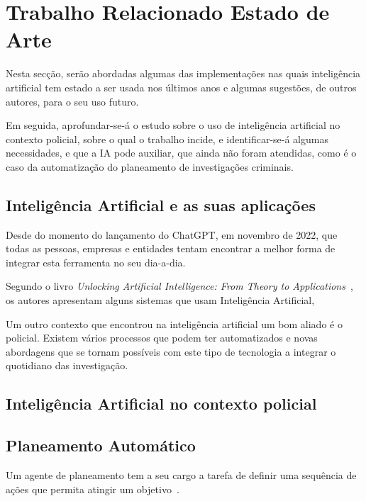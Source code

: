 % 
%  
%
\chapter{Trabalho Relacionado Estado de Arte}
\label{cha:trab_art}

Nesta secção, serão abordadas algumas  das implementações nas quais inteligência artificial tem estado a ser usada nos últimos anos e algumas sugestões, de outros autores, para o seu uso futuro.

Em seguida, aprofundar-se-á o estudo sobre o uso de inteligência artificial no contexto policial, sobre o qual o trabalho incide, e identificar-se-á algumas necessidades, e que a IA pode auxiliar, que ainda não foram atendidas, como é o caso da automatização do planeamento de investigações criminais.

\section{Inteligência Artificial e as suas aplicações}
\label{sec:ia_aplic}

Desde do momento do lançamento do ChatGPT, em novembro de 2022, que todas as pessoas, empresas e entidades tentam encontrar a melhor forma de integrar esta ferramenta no seu dia-a-dia.

Segundo o livro \textit{Unlocking Artificial Intelligence: From Theory to Applications}~\cite{Mutschler2024-tn}, os autores apresentam alguns sistemas que usam Inteligência Artificial, 

Um outro contexto que encontrou na inteligência artificial um bom aliado é o policial. Existem vários processos que podem ter automatizados e novas abordagens que se tornam possíveis com este tipo de tecnologia a integrar o quotidiano das investigação.

\section{Inteligência Artificial no contexto policial}
\label{sec:ia_policia}

\section{Planeamento Automático}
\label{sec:plan_auto}

Um agente de planeamento tem a seu cargo a tarefa de definir uma sequência de ações que permita atingir um objetivo~\cite{Russell1998-hm}.

